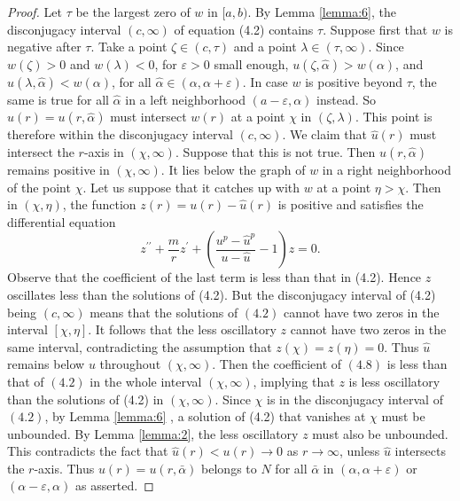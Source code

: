 \begin{proof}
  Let $\tau$ be the largest zero of $w$ in $[a, b)$.
  By Lemma \ref{lemma:6}, the disconjugacy interval $(c, \infty)$ of equation (4.2) contains $\tau$. 
  Suppose first that $w$ is negative after $\tau$. Take a point $\zeta \in(c, \tau)$ and a 
  point $\lambda \in(\tau, \infty)$. Since $w(\zeta)>0$ and $w(\lambda)<0$, for $\varepsilon>0$ 
  small enough, $u(\zeta, \hat{\alpha})>w(\alpha)$, and $u(\lambda, \hat{\alpha})<w(\alpha)$, 
  for all $\hat{\alpha} \in(\alpha, \alpha+\varepsilon)$. In case $w$ is positive beyond 
  $\tau$, the same is true for all $\hat{\alpha}$ in a left neighborhood
  $(a-\varepsilon, \alpha)$ instead. So $\hat{u}(r)=u(r, \hat{\alpha})$ must intersect $w(r)$ 
  at a point $\chi$ in $(\zeta, \lambda)$. This point is therefore within the disconjugacy 
  interval $(c, \infty)$. We claim that $\hat{u}(r)$ must intersect the $r$-axis
  in $(\chi, \infty)$. Suppose that this is not true. Then $u(r, \hat{\alpha})$
  remains positive in $(\chi, \infty)$. It lies below the graph of $w$ in a right neighborhood 
  of the point $\chi$. Let us suppose that it catches up with $w$ at a point $\eta>\chi$.
  Then in $(\chi, \eta)$, the function $z(r)=u(r)-\hat{u}(r)$ is positive and satisfies the 
  differential equation
  \begin{equation}\label{eq:4.8}
    z^{\prime \prime}+\frac{m}{r} z^{\prime}+\left(\frac{u^p-\hat{u}^p}{u-\hat{u}}-1\right) z=0.    
  \end{equation}
  Observe that the coefficient of the last term is less than that in (4.2).
  Hence $z$ oscillates less than the solutions of (4.2). But the disconjugacy interval of (4.2) 
  being $(c, \infty)$ means that the solutions of $(4.2)$ cannot have two zeros in the interval 
  $[\chi, \eta]$. It follows that the less oscillatory $z$ cannot have two zeros in the same 
  interval, contradicting the assumption that $z(\chi)=z(\eta)=0$. Thus $\hat{u}$ remains below 
  $u$ throughout $(\chi, \infty)$. Then the coefficient of $(4.8)$ is less than that of $(4.2)$ 
  in the whole interval $(\chi, \infty)$, implying that $z$ is less oscillatory than the 
  solutions of (4.2) in $(\chi, \infty)$. Since $\chi$ is in the disconjugacy interval
  of $(4.2)$, by Lemma \ref{lemma:6} , a solution of (4.2) that vanishes at $\chi$ must be unbounded.
  By Lemma \ref{lemma:2}, the less oscillatory $z$ must also be unbounded. This contradicts the fact that 
  $\hat{u}(r)<u(r) \rightarrow 0$ as $r \rightarrow \infty$, unless $\hat{u}$ intersects the 
  $r$-axis. Thus $u(r)=u(r, \bar{\alpha})$ belongs to $N$ for all $\bar{\alpha}$
  in $(\alpha, \alpha+\varepsilon)$ or $(\alpha-\varepsilon, \alpha)$ as asserted.
\end{proof}

